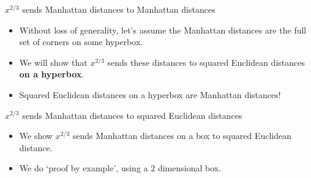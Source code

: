 %

\begin{frame}{$x^{2/3}$ sends Manhattan distances to Manhattan
  distances}
  \begin{itemize}[<+->]
  \item Without loss of generality, let's assume the Manhattan distances
  are the full set of corners on some hyperbox.
  \item We will show that $x^{2/3}$ sends these distances to squared
  Euclidean distances \textbf{on a hyperbox}. 
  \item Squared Euclidean distances on a hyperbox are Manhattan
  distances!
  \end{itemize}
\end{frame}

\begin{frame}{$x^{2/3}$ sends Manhattan distances to squared Euclidean
  distances}
  \begin{itemize}[<+->]
  \item We show $x^{2/3}$ sends Manhattan distances on a box to squared
  Euclidean distance.
  \item We do `proof by example', using a $2$ dimensional box.
  \end{itemize}
\end{frame}

